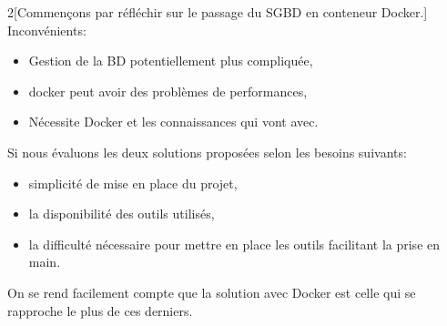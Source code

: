 \documentclass[
    iai, %
    il, %
]{heig-tb}
\begin{document}
\begin{multicols}{2}[Commençons par réfléchir sur le passage du SGBD en conteneur Docker.]
    Inconvénients:
    \begin{itemize}
        \item Gestion de la BD potentiellement plus compliquée,
        \item \Gls{docker} peut avoir des problèmes de performances, \cite{labrecque}
        \item Nécessite Docker et les connaissances qui vont avec. \cite{labrecque}
    \end{itemize}
\end{multicols}

Si nous évaluons les deux solutions proposées selon les besoins suivants:
\begin{itemize}
    \item simplicité de mise en place du projet,
    \item la disponibilité des outils utilisés,
    \item la difficulté nécessaire pour mettre en place les outils facilitant la prise en main.
\end{itemize}

On se rend facilement compte que la solution avec Docker est celle qui se rapproche le plus de ces derniers.
\end{document}
